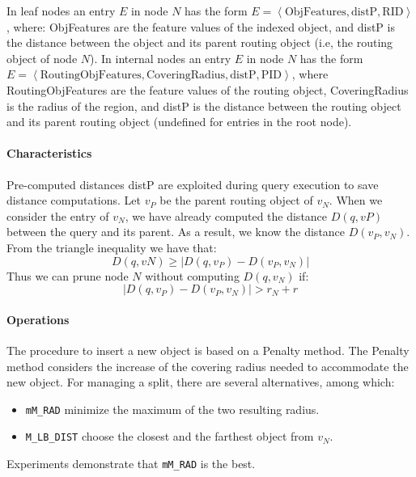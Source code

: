 In leaf nodes an entry $E$ in node $N$ has the form $E=\left\langle \text{ObjFeatures}, \text{distP}, \text{RID} \right\rangle $, where: ObjFeatures are the feature values of the indexed object, and distP is the distance between the object and its parent routing object (i.e, the routing object of node $N$). 
In internal nodes an entry $E$ in node $N$ has the form $E=\left\langle \text{RoutingObjFeatures}, \text{CoveringRadius}, \text{distP}, \text{PID} \right\rangle $, where RoutingObjFeatures are the feature values of the routing object, CoveringRadius is the radius of the region, and distP is the distance between the routing object and its parent routing object (undefined for entries in the root node). 

\paragraph*{Characteristics}
Pre-computed distances distP are exploited during query execution to save distance computations. 
Let $v_P$ be the parent routing object of $v_N$. 
When we consider the entry of $v_N$, we have already computed the distance $D(q,vP)$ between the query and its parent. 
As a result, we know the distance $D(v_P,v_N)$. 
From the triangle inequality we have that: 
\[D(q,vN) \geq \left\lvert  D(q,v_P) - D(v_P,v_N)\right\rvert\]
Thus we can prune node $N$ without computing $D(q,v_N)$ if: 
\[\left\lvert D(q,v_P) - D(v_P,v_N)\right\rvert > r_N + r\]

\paragraph*{Operations}
The procedure to insert a new object is based on a Penalty method. 
The Penalty method considers the increase of the covering radius needed to accommodate the new object. 
For managing a split, there are several alternatives, among which:
\begin{itemize}
    \item \texttt{mM_RAD} minimize the maximum of the two resulting radius. 
    \item \texttt{M_LB_DIST} choose the closest and the farthest object from $v_N$.
\end{itemize}
Experiments demonstrate that \texttt{mM_RAD} is the best. 